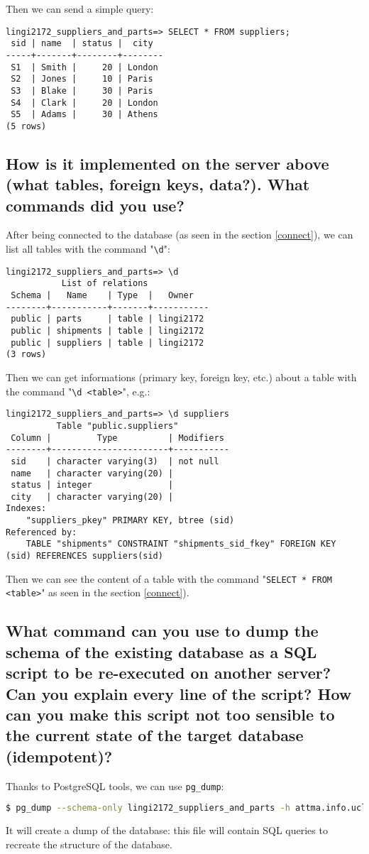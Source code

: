 \documentclass[a4paper,11pt]{article}
\begin{document}
Then we can send a simple query:
\begin{lstlisting}[flexiblecolumns=false]
lingi2172_suppliers_and_parts=> SELECT * FROM suppliers;
 sid | name  | status |  city  
-----+-------+--------+--------
 S1  | Smith |     20 | London
 S2  | Jones |     10 | Paris
 S3  | Blake |     30 | Paris
 S4  | Clark |     20 | London
 S5  | Adams |     30 | Athens
(5 rows)
\end{lstlisting}


\subsection{How is it implemented on the server above (what tables, foreign keys, data?). What commands did you use?}
After being connected to the database (as seen in the section \vref{connect}), we can list all tables with the command "\verb|\d|":
\begin{lstlisting}[flexiblecolumns=false]
lingi2172_suppliers_and_parts=> \d
           List of relations
 Schema |   Name    | Type  |   Owner   
--------+-----------+-------+-----------
 public | parts     | table | lingi2172
 public | shipments | table | lingi2172
 public | suppliers | table | lingi2172
(3 rows)
\end{lstlisting}
Then we can get informations (primary key, foreign key, etc.) about a table with the command "\verb|\d <table>|", e.g.:
\begin{lstlisting}[flexiblecolumns=false]
lingi2172_suppliers_and_parts=> \d suppliers
          Table "public.suppliers"
 Column |         Type          | Modifiers 
--------+-----------------------+-----------
 sid    | character varying(3)  | not null
 name   | character varying(20) | 
 status | integer               | 
 city   | character varying(20) | 
Indexes:
    "suppliers_pkey" PRIMARY KEY, btree (sid)
Referenced by:
    TABLE "shipments" CONSTRAINT "shipments_sid_fkey" FOREIGN KEY (sid) REFERENCES suppliers(sid)
\end{lstlisting}
Then we can see the content of a table with the command "\texttt{SELECT * FROM <table>}" as seen in the section \vref{connect}).


\subsection{What command can you use to dump the schema of the existing database as a SQL script to be re-executed on another server? Can you explain every line of the script? How can you make this script not too sensible to the current state of the target database (idempotent)?}
Thanks to PostgreSQL tools, we can use \texttt{pg\_dump}:
\begin{lstlisting}[language=bash]
	$ pg_dump --schema-only lingi2172_suppliers_and_parts -h attma.info.ucl.ac.be -U lingi2172student > lingi2172student_schemas.sql
\end{lstlisting}
It will create a dump of the database: this file will contain SQL queries to recreate the structure of the database.\\
\end{document}
